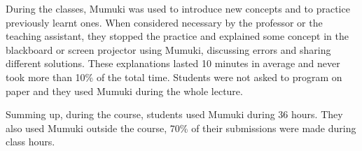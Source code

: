 During the classes, Mumuki was used to introduce new concepts and to practice previously learnt ones. When considered necessary by the professor or the teaching assistant, they stopped the practice and explained some concept in the blackboard or screen projector using Mumuki, discussing errors and sharing different solutions. These explanations lasted 10 minutes in average and never took more than 10\% of the total time. Students were not asked to program on paper and they used Mumuki during the whole lecture. 

Summing up, during the course, students used Mumuki during 36 hours. They also used Mumuki outside the course, 70\% of their submissions were made during class hours. 